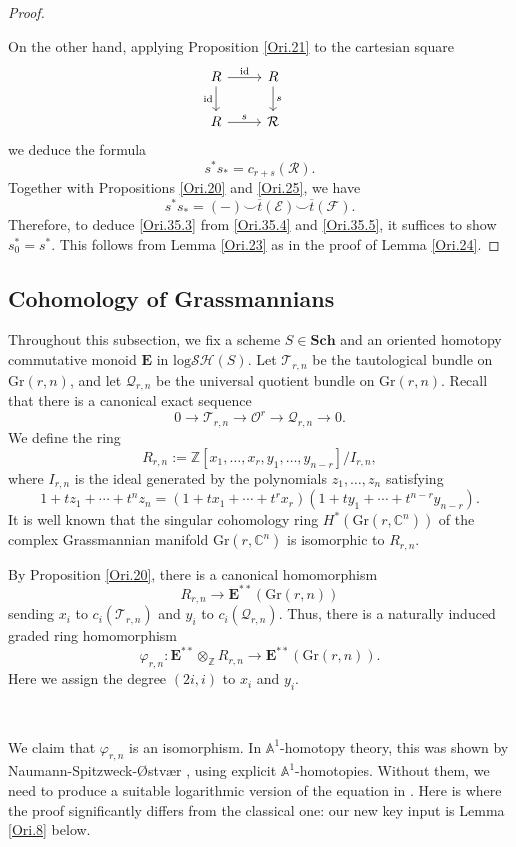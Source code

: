 \documentclass[11pt, a4paper]{amsart}
\theoremstyle{definition}
\numberwithin{equation}{subsection}
\newcommand{\Z}{\mathbb{Z}}
\newcommand{\C}{\mathbb{C}}
\newcommand{\A}{\mathbb{A}}
\newcommand{\Sch}{\mathbf{Sch}}
\newcommand{\id}{\operatorname{id}}   			%
\newcommand{\Gr}{{\mathrm{Gr}}}
\newcommand{\ol}{\overline}
\newcommand{\cE}{\mathcal{E}}
\newcommand{\cF}{\mathcal{F}}
\newcommand{\cO}{\mathcal{O}}
\newcommand{\cQ}{\mathcal{Q}}
\newcommand{\cR}{\mathcal{R}}
\newcommand{\cT}{\mathcal{T}}
\newcommand{\ringE}{\mathbf{E}}
\newcommand{\inflogSH}{\mathrm{log}\mathcal{SH}}
\begin{document}
\begin{proof}
\

On the other hand, 
applying Proposition \ref{Ori.21} to the cartesian square
\[
\begin{tikzcd}
R\ar[r,"\id"]\ar[d,"\id"']&
R\ar[d,"s"]&
\\
R\ar[r,"s"]&
\cR
\end{tikzcd}
\]
we deduce the formula
\[
s^*s_*=c_{r+s}(\cR).
\]
Together with Propositions \ref{Ori.20} and \ref{Ori.25}, we have 
\begin{equation}
\label{Ori.35.5}
s^*s_*=(-)\smile \ol{t}(\cE)\smile \ol{t}(\cF).
\end{equation}
Therefore, to deduce \eqref{Ori.35.3} from \eqref{Ori.35.4} and \eqref{Ori.35.5}, 
it suffices to show $s_0^*=s^*$.
This follows from Lemma \ref{Ori.23} as in the proof of Lemma \ref{Ori.24}.
\end{proof}




\subsection{Cohomology of Grassmannians}\label{ssec:Grass}
Throughout this subsection, 
we fix a scheme $S\in \Sch$ and an oriented homotopy commutative monoid $\ringE$ in $\inflogSH(S)$.
Let $\cT_{r,n}$ be the tautological bundle on $\Gr(r,n)$, 
and let $\cQ_{r,n}$ be the universal quotient bundle on $\Gr(r,n)$.
Recall that there is a canonical exact sequence
\[
0 \to \cT_{r,n} \to \cO^r \to \cQ_{r,n} \to 0.
\]
We define the ring
\begin{equation} \label{eq:ring_grass}
R_{r,n}
:=
\Z[x_1,\ldots,x_r,y_1,\ldots,y_{n-r}]/I_{r,n},
\end{equation}
where $I_{r,n}$ is the ideal generated by the polynomials $z_1,\ldots,z_n$ satisfying
\[
1+tz_1+\cdots+t^nz_n
=
(1+tx_1+\cdots + t^r x_r)(1+ty_1+\cdots +t^{n-r}y_{n-r}).
\]
It is well known that the singular cohomology ring $H^*(\Gr(r,\C^n))$ of the complex 
Grassmannian manifold $\Gr(r,\C^n)$ is isomorphic to $R_{r,n}$.


By Proposition \ref{Ori.20}, there is a canonical homomorphism
\[
R_{r,n}
\to
\ringE^{**}(\Gr(r,n))
\]
sending $x_i$ to $c_i(\cT_{r,n})$ and $y_i$ to $c_i(\cQ_{r,n})$.
Thus, there is a naturally induced graded ring homomorphism
\[
\varphi_{r,n}
\colon
\ringE^{**}\otimes_{\Z} R_{r,n}
\to
\ringE^{**}(\Gr(r,n)).
\]
Here we assign the degree $(2i,i)$ to $x_i$ and $y_i$.

\ 

We claim that $\varphi_{r,n}$ is an isomorphism.
In $\A^1$-homotopy theory, 
this was shown by Naumann-Spitzweck-{\O}stv{\ae}r \cite[Proposition 6.1]{zbMATH05663788}, using explicit $\A^1$-homotopies. Without them, we need to produce a suitable logarithmic version of the equation in
\cite[(18)]{zbMATH05663788}. Here is where the proof significantly differs from the classical one: our new key input is Lemma \ref{Ori.8} below.
\end{document}
